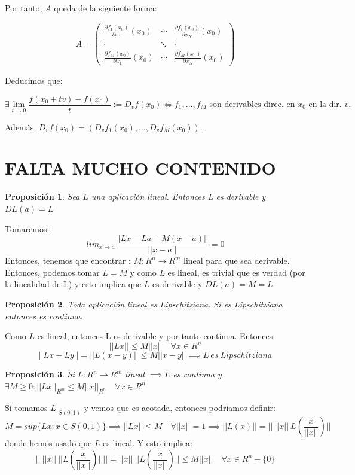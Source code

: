\documentclass[11pt, a4paper, titlepage]{article}
\makeatletter
\renewenvironment{proof}[1][\proofname] {\vspace{-15pt}\par\pushQED{\qed}\normalfont\topsep6\p@\@plus6\p@\relax\trivlist\item[\hskip\labelsep\it#1\@addpunct{.}]\ignorespaces}{\popQED\endtrivlist\@endpefalse}
\theoremstyle{theorem-style}
\newtheorem*{nprop}{Proposición}
\theoremstyle{definition-style}
\theoremstyle{remark-style}
\theoremstyle{example-style}
\makeatother
\begin{document}
Por tanto, $A$ queda de la siguiente forma:

\[
	A = \begin{pmatrix}
	\frac{\partial f_1(x_0)}{\partial x_1} (x_0) & \cdots & \frac{\partial f_1(x_0)}{\partial x_N} (x_0)\\
	\vdots & \ddots & \vdots\\
	\frac{\partial f_M(x_0)}{\partial x_1} (x_0) & \cdots & \frac{\partial f_M(x_0)}{\partial x_N} (x_0)
\end{pmatrix}
\]

Deducimos que:

\[
	\exists \lim_{t\to 0} \frac{f(x_0+tv) - f(x_0)}{t} := D_vf(x_0) \iff f_1, \dots, f_M \text{ son derivables direc. en $x_0$ en la dir. $v$.}
\]

Además, $D_vf(x_0) = (D_vf_1(x_0), \dots, D_vf_M(x_0))$.







\section{FALTA MUCHO CONTENIDO}

\begin{nprop}
	Sea $L$ una aplicación lineal. Entonces L es derivable y $DL(a) = L$
	
\end{nprop}
\begin{proof}
	
	Tomaremos:
	\[
	lim_{x\to a} \frac{||Lx -La - M(x-a)||}{||x-a||}= 0
	\]
	Entonces, tenemos que encontrar : $M: R^n \to R^m$ lineal para que sea derivable. Entonces, podemos tomar $L=M$ y como $L$ es lineal, es trivial que es verdad (por la linealidad de L) y esto implica que $L$ es derivable y $DL(a) = M = L$. 
\end{proof}

\begin{nprop}
	Toda aplicación lineal es Lipschitziana. Si es Lipschitziana entonces es continua.
\end{nprop}
\begin{proof}
	Como $L$ es lineal, entonces L es derivable y por tanto continua. Entonces:
	\[
	||Lx|| \leq M||x|| \quad \forall x \in R^n	
	\]
	\[
	 ||Lx-Ly|| = ||L(x-y) || \leq M||x-y|| \implies L\ es \ Lipschitziana
	\]
\end{proof}


\begin{nprop}
	Si $L:R^n \to R^m$ lineal $\implies L $ es continua y $\exists M \geq 0: ||Lx||_{R^m} \leq M ||x||_{R^n} \quad \forall x \in R^n$
\end{nprop}
\begin{proof}
	Si tomamos $L|_{S(0,1)}$ y vemos que es acotada, entonces podríamos definir: \[M = sup\{Lx : x \in S(0,1)\} \implies ||Lx|| \leq M \quad \forall ||x|| = 1 \implies ||L(x)|| = ||\ ||x||\ L(\frac{x}{||x||}) ||\] donde hemos usado que $L$ es lineal. Y esto implica: \[||\ ||x||\ || L(\frac{x}{||x||})|| || = ||x||\ || L(\frac{x}{||x||}) || \leq M||x|| \quad \forall x \in R^n-\{0\}\]
\end{proof}
\end{document}
